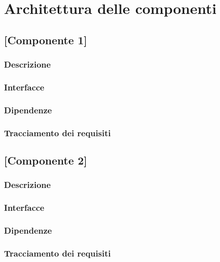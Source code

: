 \newpage
\section{Architettura delle componenti}

\subsection{[Componente 1]}
    \subsubsection{Descrizione}
    \subsubsection{Interfacce}
    \subsubsection{Dipendenze} %
    \subsubsection{Tracciamento dei requisiti}

\subsection{[Componente 2]}
    \subsubsection{Descrizione}
    \subsubsection{Interfacce}
    \subsubsection{Dipendenze} %
    \subsubsection{Tracciamento dei requisiti}

\newpage
